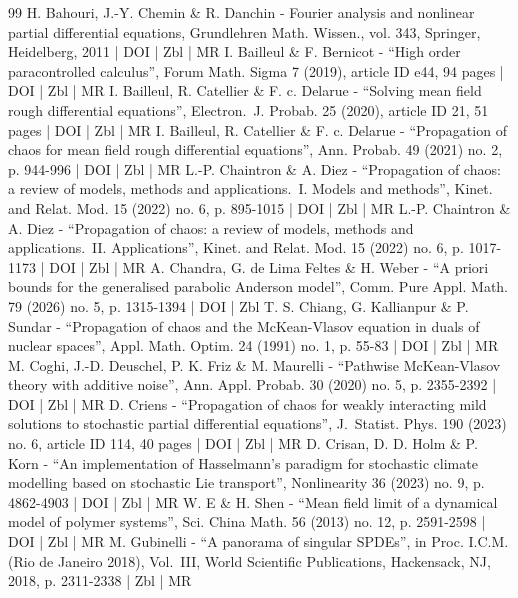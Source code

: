 \begin{thebibliography}{99}
H. Bahouri, J.-Y. Chemin \& R. Danchin - Fourier analysis and nonlinear partial differential equations, Grundlehren Math. Wissen., vol. 343, Springer, Heidelberg, 2011 | DOI | Zbl | MR
I. Bailleul \& F. Bernicot - “High order paracontrolled calculus”, Forum Math. Sigma 7 (2019), article ID e44, 94 pages | DOI | Zbl | MR
I. Bailleul, R. Catellier \& F. c. Delarue - “Solving mean field rough differential equations”, Electron. J. Probab. 25 (2020), article ID 21, 51 pages | DOI | Zbl | MR
I. Bailleul, R. Catellier \& F. c. Delarue - “Propagation of chaos for mean field rough differential equations”, Ann. Probab. 49 (2021) no. 2, p. 944-996 | DOI | Zbl | MR
L.-P. Chaintron \& A. Diez - “Propagation of chaos: a review of models, methods and applications. I. Models and methods”, Kinet. and Relat. Mod. 15 (2022) no. 6, p. 895-1015 | DOI | Zbl | MR
L.-P. Chaintron \& A. Diez - “Propagation of chaos: a review of models, methods and applications. II. Applications”, Kinet. and Relat. Mod. 15 (2022) no. 6, p. 1017-1173 | DOI | Zbl | MR
A. Chandra, G. de Lima Feltes \& H. Weber - “A priori bounds for the generalised parabolic Anderson model”, Comm. Pure Appl. Math. 79 (2026) no. 5, p. 1315-1394 | DOI | Zbl
T. S. Chiang, G. Kallianpur \& P. Sundar - “Propagation of chaos and the McKean-Vlasov equation in duals of nuclear spaces”, Appl. Math. Optim. 24 (1991) no. 1, p. 55-83 | DOI | Zbl | MR
M. Coghi, J.-D. Deuschel, P. K. Friz \& M. Maurelli - “Pathwise McKean-Vlasov theory with additive noise”, Ann. Appl. Probab. 30 (2020) no. 5, p. 2355-2392 | DOI | Zbl | MR
D. Criens - “Propagation of chaos for weakly interacting mild solutions to stochastic partial differential equations”, J. Statist. Phys. 190 (2023) no. 6, article ID 114, 40 pages | DOI | Zbl | MR
D. Crisan, D. D. Holm \& P. Korn - “An implementation of Hasselmann’s paradigm for stochastic climate modelling based on stochastic Lie transport”, Nonlinearity 36 (2023) no. 9, p. 4862-4903 | DOI | Zbl | MR
W. E \& H. Shen - “Mean field limit of a dynamical model of polymer systems”, Sci. China Math. 56 (2013) no. 12, p. 2591-2598 | DOI | Zbl | MR
M. Gubinelli - “A panorama of singular SPDEs”, in Proc. I.C.M. (Rio de Janeiro 2018), Vol. III, World Scientific Publications, Hackensack, NJ, 2018, p. 2311-2338 | Zbl | MR

\end{thebibliography}
